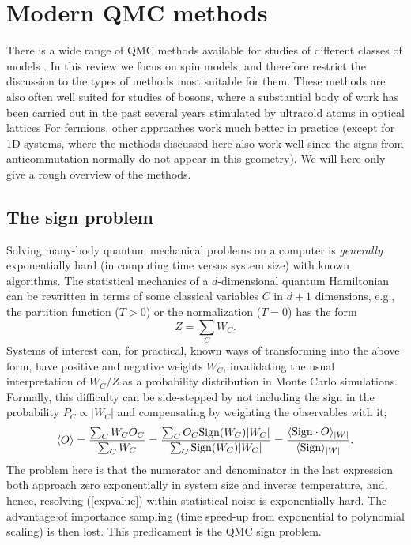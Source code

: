 \documentclass[range]{ar2e}
\begin{document}
\section{Modern QMC methods}
\label{sec:methods}

There is a wide range of QMC methods available for studies of different classes of models \cite{Assaad07,Evertz03,Sandvik10b}. In this review we 
focus on spin models, and therefore restrict the discussion to the types of methods most suitable for them. These methods are also often well suited 
for studies of bosons, where a substantial body of work has been carried out in the past several years stimulated by ultracold atoms in optical 
lattices \cite{Kashurnikov02,Wessel04,Kato08,Pollet10} For fermions, other approaches \cite{Hirsch82,Assaad07} work much better in practice (except 
for 1D systems, where the methods discussed here also work well since the signs from anticommutation normally do not appear in this geometry). We 
will here only give a rough overview of the methods.

\subsection{The sign problem}
\label{ss:sign}

Solving many-body quantum mechanical problems on a computer is {\em generally} exponentially hard (in computing time versus system size) 
with known algorithms. The statistical mechanics of a $d$-dimensional quantum Hamiltonian can be rewritten in terms of some classical variables 
$C$ in $d+1$ dimensions, e.g., the partition function ($T>0$) or the normalization ($T=0$) has the form
\begin{equation}
\label{eq:wc}
Z=\sum_C W_C.
\end{equation}
Systems of interest can, for practical, known ways of transforming into the above form, have positive and negative weights $W_C$, 
invalidating the usual interpretation of $W_C/Z$ as a probability distribution in Monte Carlo simulations. Formally, this difficulty 
can be side-stepped by not including the sign in the probability $P_C \propto |W_C|$ and compensating by weighting the observables with it;
\begin{equation}
\langle O \rangle = \frac{\sum_C W_C O_C}{\sum_C W_C} =
\frac{\sum_C O_C {\rm Sign}(W_C) |W_C|}{\sum_C {\rm Sign}(W_C)|W_C|} = 
\frac{\langle {\rm Sign} \cdot O\rangle_{|W|}}{\langle {\rm Sign}\rangle_{|W|}}.
\label{expvalue}
\end{equation}
The problem here is that the numerator and denominator in the last expression both approach zero
exponentially in system size and inverse temperature, and, hence, resolving (\ref{expvalue})
within statistical noise is exponentially hard. The advantage of importance sampling (time speed-up 
from exponential to polynomial scaling) is then lost. This predicament is the QMC sign problem.
\end{document}
